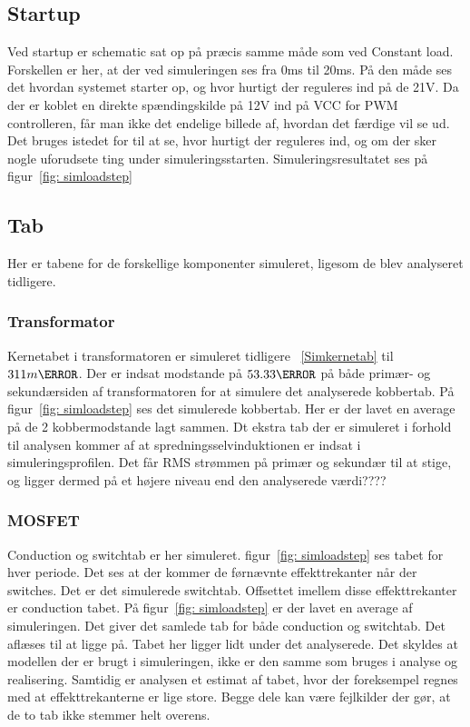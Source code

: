 \subsection{Startup}
Ved startup er schematic sat op på præcis samme måde som ved Constant load. Forskellen er her, at der ved simuleringen ses fra 0ms til 20ms. På den måde ses det hvordan systemet starter op, og hvor hurtigt der reguleres ind på de 21V. Da der er koblet en direkte spændingskilde på 12V ind på VCC for PWM controlleren, får man ikke det endelige billede af, hvordan det færdige vil se ud. Det bruges istedet for til at se, hvor hurtigt der reguleres ind, og om der sker nogle uforudsete ting under simuleringsstarten.
 Simuleringsresultatet ses på figur~\ref{fig: simloadstep} 

  

\subsection{Tab}
Her er tabene for de forskellige komponenter simuleret, ligesom de blev analyseret tidligere.

\subsubsection{Transformator}
Kernetabet i transformatoren er simuleret tidligere ~\ref{Simkernetab} til $311m\watt$. Der er indsat modstande på $53.33\ohm$ på både primær- og sekundærsiden af transformatoren for at simulere det analyserede kobbertab. På figur~\ref{fig: simloadstep} ses det simulerede kobbertab. Her er der lavet en average på de 2 kobbermodstande lagt sammen. 
Dt ekstra tab der er simuleret i forhold til analysen kommer af at spredningsselvinduktionen er indsat i simuleringsprofilen. Det får RMS strømmen på primær og sekundær til at stige, og ligger dermed på et højere niveau end den analyserede værdi????
\subsubsection{MOSFET}
Conduction og switchtab er her simuleret. figur~\ref{fig: simloadstep} ses tabet for hver periode. Det ses at der kommer de førnævnte effekttrekanter når der switches. Det er det simulerede switchtab. Offsettet imellem disse effekttrekanter er conduction tabet.
På figur~\ref{fig: simloadstep} er der lavet en average af simuleringen. Det giver det samlede tab for både conduction og switchtab. Det aflæses til at ligge på. Tabet her ligger lidt under det analyserede. Det skyldes at modellen der er brugt i simuleringen, ikke er den samme som bruges i analyse og realisering. Samtidig er analysen et estimat af tabet, hvor der foreksempel regnes med at effekttrekanterne er lige store. Begge dele kan være fejlkilder der gør, at de to tab ikke stemmer helt overens.  

